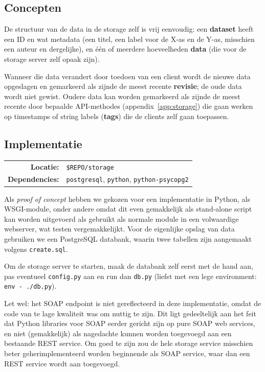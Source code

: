 \documentclass[a4paper]{article}
\begin{document}
\subsection{Concepten}

De structuur van de data in de storage zelf is vrij eenvoudig: een
{\bf dataset} heeft een ID en wat metadata (een titel, een label voor de X-as
en de Y-as, misschien een auteur en dergelijke), en \'e\'en of meerdere
hoeveelheden {\bf data} (die voor de storage server zelf opaak zijn).

Wanneer die data verandert door toedoen van een client wordt de nieuwe data
opgeslagen en gemarkeerd als zijnde de meest recente {\bf revisie}; de oude
data wordt niet gewist. Oudere data kan worden gemarkeerd als zijnde de meest
recente door bepaalde \gls{API}-methodes (appendix~\ref{app:storage}) die gaan
werken op timestamps of string labels ({\bf tags}) die de clients zelf gaan
toepassen.

\subsection{Implementatie}

\begin{tabular}{rl}
    {\bf Locatie:}      &   {\tt \$REPO/storage} \\
    {\bf Dependencies:} &   {\tt postgresql}, {\tt python},
                            {\tt python-psycopg2}
\end{tabular}

\vspace{.05in}

Als {\it proof of concept} hebben we gekozen voor een implementatie in Python,
als \gls{WSGI}-module, onder andere omdat dit even gemakkelijk als stand-alone
script kan worden uitgevoerd als gebruikt als normale module in een volwaardige
webserver, wat testen vergemakkelijkt. Voor de eigenlijke opslag van data
gebruiken we een Postgre\gls{SQL} databank, waarin twee tabellen zijn
aangemaakt volgens {\tt create.sql}.

Om de storage server te starten, maak de databank zelf eerst met de hand aan,
pas eventueel {\tt config.py} aan en run dan {\tt db.py} (liefst met een lege
environment: {\tt env - ./db.py}).

Let wel: het \gls{SOAP} endpoint is niet gereflecteerd in deze implementatie,
omdat de code van te lage kwaliteit was om nuttig te zijn. Dit ligt
gedeeltelijk aan het feit dat Python libraries voor \gls{SOAP} eerder gericht
zijn op pure \gls{SOAP} web services, en niet (gemakkelijk) als nagedachte
kunnen worden toegevoegd aan een bestaande \gls{REST} service. Om goed te zijn
zou de hele storage service misschien beter geherimplementeerd worden
beginnende als \gls{SOAP} service, waar dan een \gls{REST} service wordt aan
toegevoegd.
\end{document}
